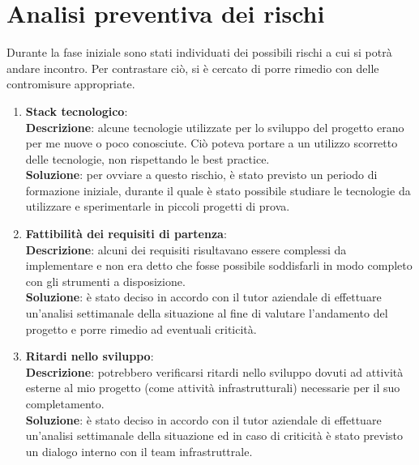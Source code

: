 \section{Analisi preventiva dei rischi}
Durante la fase iniziale sono stati individuati dei possibili rischi a cui si potrà andare incontro. Per contrastare ciò, si è cercato di porre rimedio con delle contromisure appropriate.
\begin{enumerate}
    \item \textbf{Stack tecnologico}:\\
        \textbf{Descrizione}: alcune tecnologie utilizzate per lo sviluppo del progetto erano per me nuove o poco conosciute. Ciò poteva portare a un utilizzo scorretto delle tecnologie, non rispettando le best practice.\\
        \textbf{Soluzione}: per ovviare a questo rischio, è stato previsto un periodo di formazione iniziale, durante il quale è stato possibile studiare le tecnologie da utilizzare e sperimentarle in piccoli progetti di prova.\\
    \item \textbf{Fattibilità dei requisiti di partenza}:\\
        \textbf{Descrizione}: alcuni dei requisiti risultavano essere complessi da implementare e non era detto che fosse possibile soddisfarli in modo completo con gli strumenti a disposizione.\\
        \textbf{Soluzione}: è stato deciso in accordo con il tutor aziendale di effettuare un'analisi settimanale della situazione al fine di valutare l'andamento del progetto e porre rimedio ad eventuali criticità.\\ 
    \item \textbf{Ritardi nello sviluppo}:\\
        \textbf{Descrizione}: potrebbero verificarsi ritardi nello sviluppo dovuti ad attività esterne al mio progetto (come attività infrastrutturali) necessarie per il suo completamento.\\
        \textbf{Soluzione}: è stato deciso in accordo con il tutor aziendale di effettuare un'analisi settimanale della situazione ed in caso di criticità è stato previsto un dialogo interno con il team infrastruttrale.\\
\end{enumerate}








